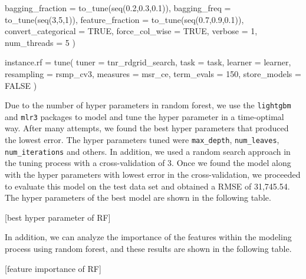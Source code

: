 \documentclass[11pt,a4paper]{article}
\newenvironment{Shaded}{\begin{snugshade}}{\end{snugshade}}
\newcommand{\AttributeTok}[1]{\textcolor[rgb]{0.77,0.63,0.00}{#1}}
\newcommand{\ConstantTok}[1]{\textcolor[rgb]{0.00,0.00,0.00}{#1}}
\newcommand{\DecValTok}[1]{\textcolor[rgb]{0.00,0.00,0.81}{#1}}
\newcommand{\FloatTok}[1]{\textcolor[rgb]{0.00,0.00,0.81}{#1}}
\newcommand{\FunctionTok}[1]{\textcolor[rgb]{0.00,0.00,0.00}{#1}}
\newcommand{\NormalTok}[1]{#1}
\newcommand{\OtherTok}[1]{\textcolor[rgb]{0.56,0.35,0.01}{#1}}
\begin{document}
\begin{Shaded}
\begin{Highlighting}[]
              \AttributeTok{bagging\_fraction =} \FunctionTok{to\_tune}\NormalTok{(}\FunctionTok{seq}\NormalTok{(}\FloatTok{0.2}\NormalTok{,}\FloatTok{0.3}\NormalTok{,}\FloatTok{0.1}\NormalTok{)),}
              \AttributeTok{bagging\_freq =} \FunctionTok{to\_tune}\NormalTok{(}\FunctionTok{seq}\NormalTok{(}\DecValTok{3}\NormalTok{,}\DecValTok{5}\NormalTok{,}\DecValTok{1}\NormalTok{)),}
              \AttributeTok{feature\_fraction =} \FunctionTok{to\_tune}\NormalTok{(}\FunctionTok{seq}\NormalTok{(}\FloatTok{0.7}\NormalTok{,}\FloatTok{0.9}\NormalTok{,}\FloatTok{0.1}\NormalTok{)),}
              \AttributeTok{convert\_categorical =} \ConstantTok{TRUE}\NormalTok{,}
              \AttributeTok{force\_col\_wise =} \ConstantTok{TRUE}\NormalTok{,}
              \AttributeTok{verbose =} \DecValTok{1}\NormalTok{,}
              \AttributeTok{num\_threads =} \DecValTok{5}
\NormalTok{)}

\NormalTok{instance.rf }\OtherTok{=} \FunctionTok{tune}\NormalTok{(}
  \AttributeTok{tuner =}\NormalTok{ tnr\_rdgrid\_search,}
  \AttributeTok{task =}\NormalTok{ task,}
  \AttributeTok{learner =}\NormalTok{ learner,}
  \AttributeTok{resampling =}\NormalTok{ rsmp\_cv3,}
  \AttributeTok{measures =}\NormalTok{ msr\_ce,}
  \AttributeTok{term\_evals =} \DecValTok{150}\NormalTok{,}
  \AttributeTok{store\_models =} \ConstantTok{FALSE}
\NormalTok{)}
\end{Highlighting}
\end{Shaded}

Due to the number of hyper parameters in random forest, we use the
\texttt{lightgbm} and \texttt{mlr3} packages to model and tune the hyper
parameter in a time-optimal way. After many attempts, we found the best
hyper parameters that produced the lowest error. The hyper parameters
tuned were \texttt{max\_depth}, \texttt{num\_leaves},
\texttt{num\_iterations} and others. In addition, we used a random
search approach in the tuning process with a cross-validation of 3. Once
we found the model along with the hyper parameters with lowest error in
the cross-validation, we proceeded to evaluate this model on the test
data set and obtained a RMSE of 31,745.54. The hyper parameters of the
best model are shown in the following table.

{[}best hyper parameter of RF{]}

In addition, we can analyze the importance of the features within the
modeling process using random forest, and these results are shown in the
following table.

{[}feature importance of RF{]}
\end{document}
